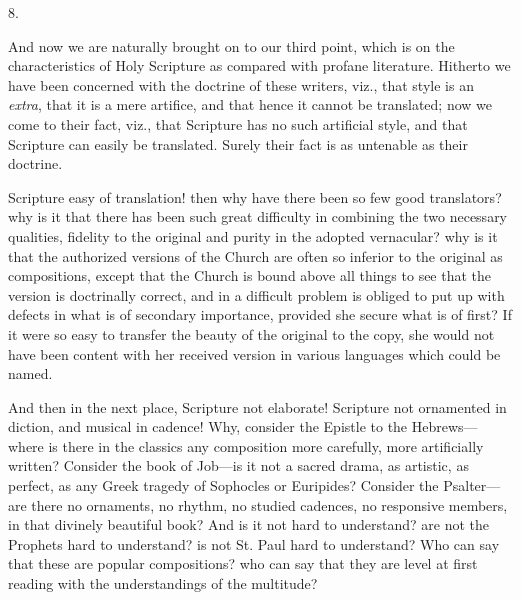 8.

And now we are naturally brought on to our third point, which is on
the characteristics of Holy Scripture as compared with profane
literature. Hitherto we have been concerned with the doctrine of these
writers, viz., that style is an \emph{extra}, that it is a mere
artifice, and that hence it cannot be translated; now we come to their
fact, viz., that Scripture has no such artificial style, and that
Scripture can easily be translated. Surely their fact is as untenable
as their doctrine.

Scripture easy of translation! then why have there been so few good
translators? why is it that there has been such great difficulty in
combining the two necessary qualities, fidelity to the original and
purity in the adopted vernacular? why is it that the authorized
versions of the Church are often so inferior to the original as
compositions, except that the Church is bound above all things to see
that the version is doctrinally correct, and in a difficult problem is
obliged to put up with defects in what is of secondary
importance, provided she secure what is of first? If it were so easy
to transfer the beauty of the original to the copy, she would not have
been content with her received version in various languages which
could be named.

And then in the next place, Scripture not elaborate! Scripture not
ornamented in diction, and musical in cadence! Why, consider the
Epistle to the Hebrews—where is there in the classics any
composition more carefully, more artificially written? Consider the
book of Job—is it not a sacred drama, as artistic, as perfect, as
any Greek tragedy of Sophocles or Euripides? Consider the Psalter—are
there no ornaments, no rhythm, no studied cadences, no responsive
members, in that divinely beautiful book? And is it not hard to
understand? are not the Prophets hard to understand? is not St. Paul
hard to understand? Who can say that these are popular compositions?
who can say that they are level at first reading with the
understandings of the multitude?

